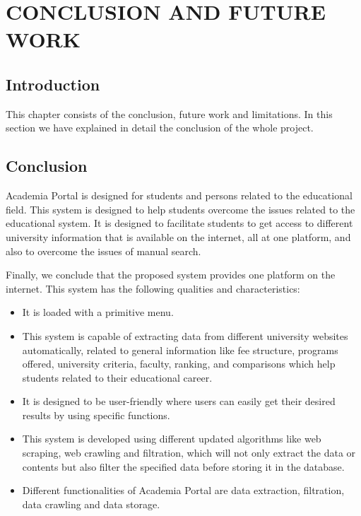 \chapter{CONCLUSION AND FUTURE WORK}

\section{Introduction}

This chapter consists of the conclusion, future work and limitations. In this section we have explained in detail the conclusion of the whole project.

\section{Conclusion}

Academia Portal is designed for students and persons related to the educational field. This system is designed to help students overcome the issues related to the educational system. It is designed to facilitate students to get access to different university information that is available on the internet, all at one platform, and also to overcome the issues of manual search.

Finally, we conclude that the proposed system provides one platform on the internet. This system has the following qualities and characteristics:

\begin{itemize}
    \item It is loaded with a primitive menu.
    \item This system is capable of extracting data from different university websites automatically, related to general information like fee structure, programs offered, university criteria, faculty, ranking, and comparisons which help students related to their educational career.
    \item It is designed to be user-friendly where users can easily get their desired results by using specific functions.
    \item This system is developed using different updated algorithms like web scraping, web crawling and filtration, which will not only extract the data or contents but also filter the specified data before storing it in the database.
    \item Different functionalities of Academia Portal are data extraction, filtration, data crawling and data storage.
\end{itemize}

